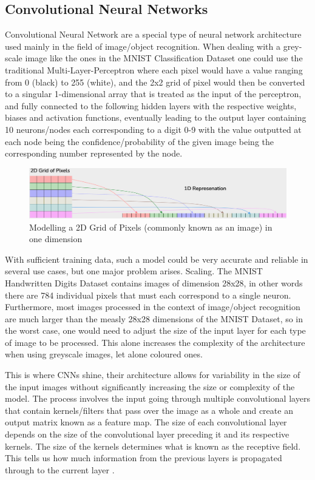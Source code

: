 \subsection{Convolutional Neural Networks}
Convolutional Neural Network are a special type of neural network architecture used mainly in the field of image/object recognition. When dealing with a grey-scale image like the ones in the MNIST Classification Dataset \cite{MNIST} one could use the traditional Multi-Layer-Perceptron \cite{Klein} where each pixel would have a value ranging from 0 (black) to 255 (white), and the 2x2 grid of pixel would then be converted to a singular 1-dimensional array that is treated as the input of the perceptron, and fully connected to the following hidden layers with the respective weights, biases and activation functions, eventually leading to the output layer containing 10 neurons/nodes each corresponding to a digit 0-9 with the value outputted at each node being the confidence/probability of the given image being the corresponding number represented by the node.
\begin{figure}[H]
    \centering
    \includegraphics[scale=0.45]{images/2Dto1D.png}
    \caption{Modelling a 2D Grid of Pixels (commonly known as an image) in one dimension}
    \label{2Dto1D}
\end{figure}


With sufficient training data, such a model could be very accurate and reliable in several use cases, but one major problem arises. Scaling. The MNIST Handwritten Digits Dataset contains images of dimension 28x28, in other words there are 784 individual pixels that must each correspond to a single neuron. Furthermore, most images processed in the context of image/object recognition are much larger than the measly 28x28 dimensions of the MNIST Dataset, so in the worst case, one would need to adjust the size of the input layer for each type of image to be processed. This alone increases the complexity of the architecture when using greyscale images, let alone coloured ones.

This is where CNNs shine, their architecture allows for variability in the size of the input images without significantly increasing the size or complexity of the model. The process involves the input going through multiple convolutional layers that contain kernels/filters that pass over the image as a whole and create an output matrix known as a feature map. The size of each convolutional layer depends on the size of the convolutional layer preceding it and its respective kernels. The size of the kernels determines what is known as the receptive field. This tells us how much information from the previous layers is propagated through to the current layer \cite{lecun2015deep}.

